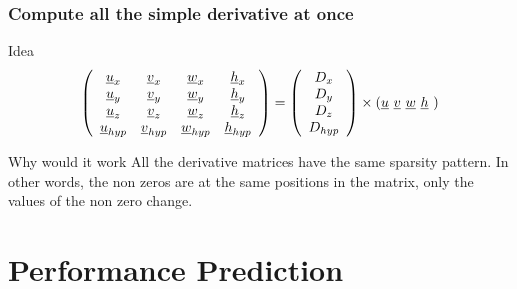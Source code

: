 \documentclass{beamer}
\begin{document}
\begin{frame}
  \frametitle{Compute all the simple derivative at once}

    \begin{block}{Idea}
      \scriptsize
      \begin{equation}
        \left( \begin{array}{cccc}
            \underline{u}_x     & \underline{v}_x     & \underline{w}_x     & \underline{h}_x \\
            \underline{u}_y     & \underline{v}_y     & \underline{w}_y     & \underline{h}_y \\
            \underline{u}_z     & \underline{v}_z     & \underline{w}_z     & \underline{h}_z \\
            \underline{u}_{hyp} & \underline{v}_{hyp} & \underline{w}_{hyp} & \underline{h}_{hyp}
          \end{array} \right)
        = \left(
          \begin{array}{c}
            D_{x}\\ D_{y}\\ D_{z}\\ D_{hyp}
          \end{array}\right)
        \times \left(\underline{u} \,\, \underline{v} \,\, \underline{w} \,\, \underline{h} \,\,\right) 
        \vspace{-1ex}
      \end{equation}
    \end{block}  
    
    \begin{block}{Why would it work}
      All the derivative matrices have the same sparsity pattern. In
      other words, the non zeros are at the same positions in the
      matrix, only the values of the non zero change.
    \end{block}

\end{frame}

\section{Performance Prediction}
\end{document}
